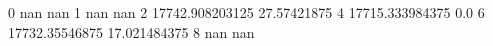 0 nan nan
1 nan nan
2 17742.908203125 27.57421875
4 17715.333984375 0.0
6 17732.35546875 17.021484375
8 nan nan

